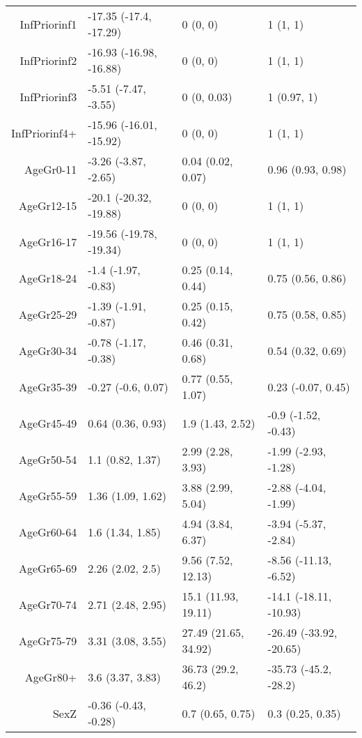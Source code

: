 \begin{table}[ht]
\begin{tabular}{rlll}
  InfPriorinf1 & -17.35 (-17.4, -17.29) & 0 (0, 0) & 1 (1, 1) \\ 
  InfPriorinf2 & -16.93 (-16.98, -16.88) & 0 (0, 0) & 1 (1, 1) \\ 
  InfPriorinf3 & -5.51 (-7.47, -3.55) & 0 (0, 0.03) & 1 (0.97, 1) \\ 
  InfPriorinf4+ & -15.96 (-16.01, -15.92) & 0 (0, 0) & 1 (1, 1) \\ 
  AgeGr0-11 & -3.26 (-3.87, -2.65) & 0.04 (0.02, 0.07) & 0.96 (0.93, 0.98) \\ 
  AgeGr12-15 & -20.1 (-20.32, -19.88) & 0 (0, 0) & 1 (1, 1) \\ 
  AgeGr16-17 & -19.56 (-19.78, -19.34) & 0 (0, 0) & 1 (1, 1) \\ 
  AgeGr18-24 & -1.4 (-1.97, -0.83) & 0.25 (0.14, 0.44) & 0.75 (0.56, 0.86) \\ 
  AgeGr25-29 & -1.39 (-1.91, -0.87) & 0.25 (0.15, 0.42) & 0.75 (0.58, 0.85) \\ 
  AgeGr30-34 & -0.78 (-1.17, -0.38) & 0.46 (0.31, 0.68) & 0.54 (0.32, 0.69) \\ 
  AgeGr35-39 & -0.27 (-0.6, 0.07) & 0.77 (0.55, 1.07) & 0.23 (-0.07, 0.45) \\ 
  AgeGr45-49 & 0.64 (0.36, 0.93) & 1.9 (1.43, 2.52) & -0.9 (-1.52, -0.43) \\ 
  AgeGr50-54 & 1.1 (0.82, 1.37) & 2.99 (2.28, 3.93) & -1.99 (-2.93, -1.28) \\ 
  AgeGr55-59 & 1.36 (1.09, 1.62) & 3.88 (2.99, 5.04) & -2.88 (-4.04, -1.99) \\ 
  AgeGr60-64 & 1.6 (1.34, 1.85) & 4.94 (3.84, 6.37) & -3.94 (-5.37, -2.84) \\ 
  AgeGr65-69 & 2.26 (2.02, 2.5) & 9.56 (7.52, 12.13) & -8.56 (-11.13, -6.52) \\ 
  AgeGr70-74 & 2.71 (2.48, 2.95) & 15.1 (11.93, 19.11) & -14.1 (-18.11, -10.93) \\ 
  AgeGr75-79 & 3.31 (3.08, 3.55) & 27.49 (21.65, 34.92) & -26.49 (-33.92, -20.65) \\ 
  AgeGr80+ & 3.6 (3.37, 3.83) & 36.73 (29.2, 46.2) & -35.73 (-45.2, -28.2) \\ 
  SexZ & -0.36 (-0.43, -0.28) & 0.7 (0.65, 0.75) & 0.3 (0.25, 0.35) \\ 
   \hline
\end{tabular}
\end{table}

